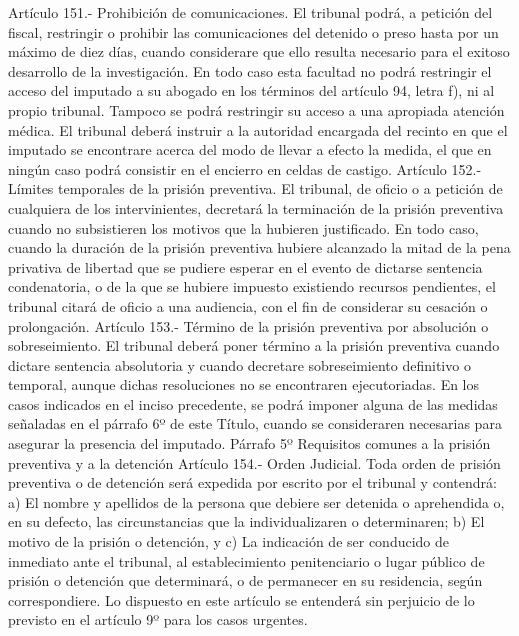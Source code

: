     Artículo 151.- Prohibición de comunicaciones. El tribunal podrá, a petición del fiscal, restringir o prohibir las comunicaciones del detenido o preso hasta por un máximo de diez días, cuando considerare que ello resulta necesario para el exitoso desarrollo de la investigación. En todo caso esta facultad no podrá restringir el acceso del imputado a su abogado en los términos del artículo 94, letra f), ni al propio tribunal. Tampoco se podrá restringir su acceso a una apropiada atención médica.
    El tribunal deberá instruir a la autoridad encargada del recinto en que el imputado se encontrare acerca del modo de llevar a efecto la medida, el que en ningún caso podrá consistir en el encierro en celdas de castigo.
    Artículo 152.- Límites temporales de la prisión preventiva. El tribunal, de oficio o a petición de cualquiera de los intervinientes, decretará la terminación de la prisión preventiva cuando no subsistieren los motivos que la hubieren justificado.
    En todo caso, cuando la duración de la prisión preventiva hubiere alcanzado la mitad de la pena privativa de libertad que se pudiere esperar en el evento de dictarse sentencia condenatoria, o de la que se hubiere impuesto existiendo recursos pendientes, el tribunal citará de oficio a una audiencia, con el fin de considerar su cesación o prolongación.
    Artículo 153.- Término de la prisión preventiva por absolución o sobreseimiento. El tribunal deberá poner término a la prisión preventiva cuando dictare sentencia absolutoria y cuando decretare sobreseimiento definitivo o temporal, aunque dichas resoluciones no se encontraren ejecutoriadas.
    En los casos indicados en el inciso precedente, se podrá imponer alguna de las medidas señaladas en el párrafo 6º de este Título, cuando se consideraren necesarias para asegurar la presencia del imputado.
    Párrafo 5º Requisitos comunes a la prisión
preventiva y a la detención
    Artículo 154.- Orden Judicial. Toda orden de prisión preventiva o de detención será expedida por escrito por el tribunal y contendrá: a) El nombre y apellidos de la persona que debiere
ser detenida o aprehendida o, en su defecto, las
circunstancias que la individualizaren o determinaren;
    b) El motivo de la prisión o detención, y
    c) La indicación de ser conducido de inmediato ante
el tribunal, al establecimiento penitenciario o lugar
público de prisión o detención que determinará, o de
permanecer en su residencia, según correspondiere.
      Lo dispuesto en este artículo se entenderá sin
perjuicio de lo previsto en el artículo 9º para los
casos urgentes.

